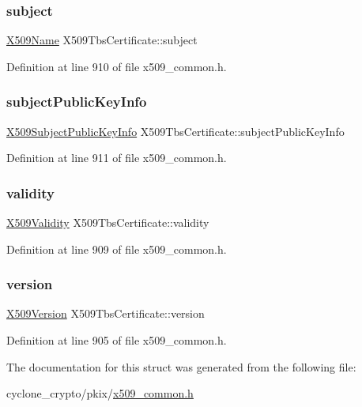 \subsubsection{\texorpdfstring{subject}{subject}}
{\footnotesize\ttfamily \hyperlink{structX509Name}{X509\+Name} X509\+Tbs\+Certificate\+::subject}



Definition at line 910 of file x509\+\_\+common.\+h.

\mbox{\label{structX509TbsCertificate_ae6d392cbe0fcd240ab1dabaac465ca95}} 
\subsubsection{\texorpdfstring{subject\+Public\+Key\+Info}{subjectPublicKeyInfo}}
{\footnotesize\ttfamily \hyperlink{structX509SubjectPublicKeyInfo}{X509\+Subject\+Public\+Key\+Info} X509\+Tbs\+Certificate\+::subject\+Public\+Key\+Info}



Definition at line 911 of file x509\+\_\+common.\+h.

\mbox{\label{structX509TbsCertificate_ad2149392b07cf44a8b6421572a93a70e}} 
\subsubsection{\texorpdfstring{validity}{validity}}
{\footnotesize\ttfamily \hyperlink{structX509Validity}{X509\+Validity} X509\+Tbs\+Certificate\+::validity}



Definition at line 909 of file x509\+\_\+common.\+h.

\mbox{\label{structX509TbsCertificate_a651e18b39b7492e6e739823ea19129d9}} 
\subsubsection{\texorpdfstring{version}{version}}
{\footnotesize\ttfamily \hyperlink{certificate_2x509__common_8h_a42c631650a1a4fbe9d70d54d99dcac26}{X509\+Version} X509\+Tbs\+Certificate\+::version}



Definition at line 905 of file x509\+\_\+common.\+h.



The documentation for this struct was generated from the following file\+:\begin{DoxyCompactItemize}
\item 
cyclone\+\_\+crypto/pkix/\hyperlink{pkix_2x509__common_8h}{x509\+\_\+common.\+h}\end{DoxyCompactItemize}
